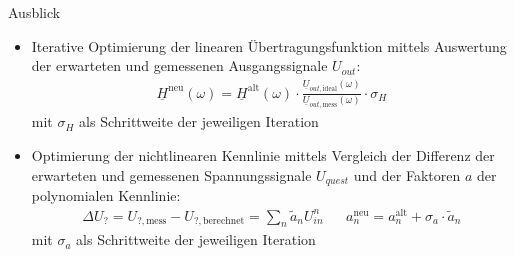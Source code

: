 \begin{frame}{Ausblick}

	\begin{itemize}
		\item Iterative Optimierung der linearen Übertragungsfunktion mittels Auswertung der erwarteten und gemessenen Ausgangssignale $U_{out}$: 
		\begin{align*}
			\underline{H}^{\mathrm{neu}} \left( \omega \right) = \underline{H}^{\mathrm{alt}} \left( \omega \right) \cdot \frac{\underline{U}_{out,\mathrm{ideal}} \left( \omega \right) 	}{\underline{U}_{out,\mathrm{mess}} \left( \omega \right)} \cdot \sigma_H
		\end{align*}
		mit $ \sigma_H $ als Schrittweite der jeweiligen Iteration
		
		\item Optimierung der nichtlinearen Kennlinie mittels Vergleich der Differenz der erwarteten und gemessenen Spannungssignale $U_{quest}$ und der Faktoren $a$ der polynomialen Kennlinie:
		\begin{align*}
			\Delta U_{?} = U_{?, \mathrm{mess}} - U_{?, \mathrm{berechnet}} = \sum_n \tilde{a}_n U_{in}^n
			&&
			a_n^{\mathrm{neu}} = a_n^{\mathrm{alt}} + \sigma_a \cdot \tilde{a}_n
		\end{align*}
		mit $\sigma_a$ als Schrittweite der jeweiligen Iteration
	\end{itemize}
	
	


\end{frame}



